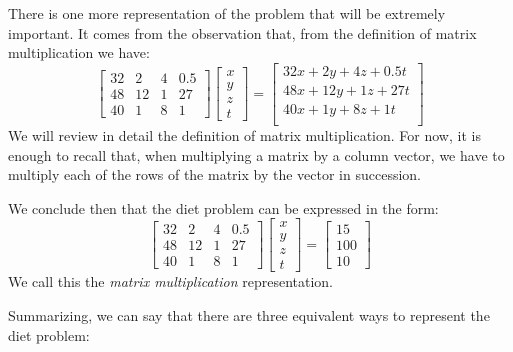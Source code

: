 \documentclass[12pt]{article}
\begin{document}
There is one more representation of the problem that will be extremely important. It comes from the observation that, from the definition of matrix multiplication we have:
\[
\begin{bmatrix}
32 & 2 & 4 & 0.5\\
48 & 12 & 1 & 27\\
40 & 1 & 8 & 1
\end{bmatrix}
\begin{bmatrix}x\\y\\z\\t\end{bmatrix}
=
\begin{bmatrix}
32x+2y+4z+0.5t\\
48x+12y+1z+27t\\
40x+1y+8z+1t\\
\end{bmatrix}
\]
We will review in detail the definition of matrix multiplication. For now, it is enough to recall that, when multiplying a matrix by a column vector, we have to multiply each of the rows of the matrix by the vector in succession.

We conclude then that the diet problem can be expressed in the form:
\[
\begin{bmatrix}
32 & 2 & 4 & 0.5\\
48 & 12 & 1 & 27\\
40 & 1 & 8 & 1
\end{bmatrix}
\begin{bmatrix}x\\y\\z\\t\end{bmatrix}=
\begin{bmatrix}
15 \\ 100 \\ 10
\end{bmatrix}
\]
We call this the \emph{matrix multiplication} representation.

Summarizing, we can say that there are three equivalent ways to represent the diet problem:
\end{document}
